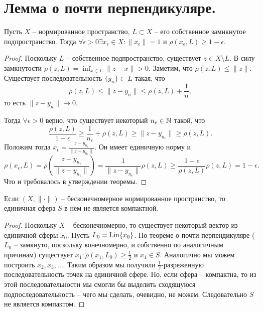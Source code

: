 \section{Лемма о почти перпендикуляре.}
\begin{lemma}
    Пусть $X$ -- нормированное пространство, $L \subset X$ -- его собственное замнкнутое подпространство.
    Тогда $\forall \epsilon > 0 \exists x_\epsilon \in X\colon \|x_\epsilon\| = 1$ и $\rho(x_\epsilon, L) \geq 1 -\epsilon$.
\end{lemma}
\begin{proof}
    Поскольку $L$ -- собственное подпространство, существует $z \in X \setminus L$.
    В силу замкнутости $\rho(z, L) = \inf_{x \in L} \|z - x\| > 0$.
    Заметим, что $\rho(z, L) \leq \|z\|$.
    Существует последовательность $\{y_n\} \subset L$ такая, что
    \[
        \rho(z, L) \leq \|z - y_n\| \leq \rho(z, L) + \frac{1}{n},
    \]
    то есть $\|z - y_n\| \rightarrow 0$.

    Тогда $\forall \epsilon > 0$ верно, что существует некоторый $n_{\varepsilon} \in \mathbb{N}$ такой, что
    \[
        \frac{\rho(z, L)}{1 - \epsilon} \geq \frac{1}{n_\epsilon} + \rho(z, L) \geq \|z - y_{n_\epsilon}\| \geq \rho(z, L).
    \]
    Положим тогда $x_\epsilon = \frac{z - y_{n_\epsilon}}{\|z - y_{n_\epsilon}\|}$.
    Он имеет единичную норму и
    \[
        \rho(x_\epsilon, L) = \rho\left(\frac{z - y_{n_\epsilon}}{\|z - y_{n_\epsilon}\|}\right) = \frac{1}{\|z - y_{n_\epsilon}\|}\rho(z, L) \geq \frac{1 - \epsilon}{\rho(z, L)}\rho(z, L) = 1 - \epsilon.
    \]
    Что и требовалось в утверждении теоремы.
\end{proof}
\begin{theorem}
    Если $(X, \|\cdot\|)$ -- бесконечномерное нормированное пространство, то единичная сфера $S$ в нём не является компактной.
\end{theorem}
\begin{proof}
    Поскольку $X$ -- бесконечномерно, то существует некоторый вектор из единичной сферы $x_0$.
    Пусть $L_0 = \operatorname{Lin}\{x_0\}$.
    По теореме о почти перпендикуляре ($L_0$ -- замкнуто, поскольку конечномерно, и собственно по аналогичным причинам) существует $x_1\colon \rho(x_1, L_0) \geq \frac{1}{2}$ и $x_1 \in S$.
    Аналогично мы можем построить $x_2, x_3, \ldots$.
    Таким образом мы получили $\frac{1}{2}$-разреженную последовательность точек на единичной сфере.
    Но, если сфера -- компактна, то из этой последовательности мы смогли бы выделить сходящуюся подпоследовательность -- чего мы сделать, очевидно, не можем.
    Следовательно $S$ не является компактом.
\end{proof}
